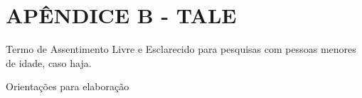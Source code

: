 \section*{APÊNDICE B - TALE}
Termo de Assentimento Livre e Esclarecido para pesquisas com pessoas menores de idade, caso haja.

{\color{red} Orientações para elaboração}

\newpage
